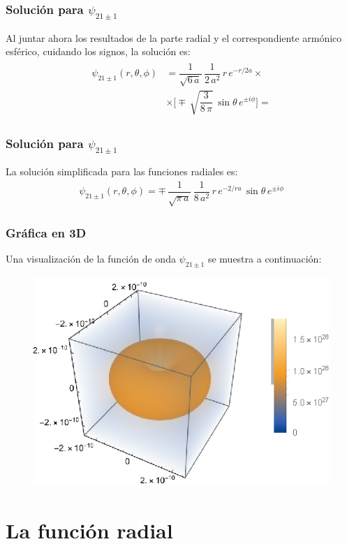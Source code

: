 \documentclass[12pt]{beamer}
\begin{document}
\begin{frame}
\frametitle{Solución para $\psi_{21 \pm 1}$}
Al juntar ahora los resultados de la parte radial y el correspondiente armónico esférico, cuidando los signos, la solución es:
\pause
\begin{eqnarray*}
\begin{aligned}
\psi_{21 \pm 1} (r, \theta, \phi) &= \dfrac{1}{\sqrt{6 \, a}} \, \dfrac{1}{2 \, a^{2}} \, r \, e^{-r/2a} \times \\[0.5em]
&\times \bigg[ \mp \, \sqrt{\dfrac{3}{8 \, \pi}} \, \sin \theta \, e^{\pm i \phi} \bigg]  =
\end{aligned}
\end{eqnarray*}
\end{frame}
\begin{frame}
\frametitle{Solución para $\psi_{21 \pm 1}$}
La solución simplificada para las funciones radiales es:
\pause
\begin{align*}
\psi_{21 \pm 1} (r, \theta, \phi) = \mp \, \dfrac{1}{\sqrt{\pi \, a}} \, \dfrac{1}{8 \, a^{2}} \, r \, e^{-2/ra} \, \sin \theta \, e^{\pm i \phi}
\end{align*}
\end{frame}
\begin{frame}
\frametitle{Gráfica en 3D}
Una visualización de la función de onda $\psi_{21 \pm 1}$ se muestra a continuación:
\pause
\begin{figure}
   \centering
   \includegraphics[scale=1]{Imagenes/Plot_Funcion_Onda_211.eps}
\end{figure}
\end{frame}

\section{La función radial}
\end{document}
